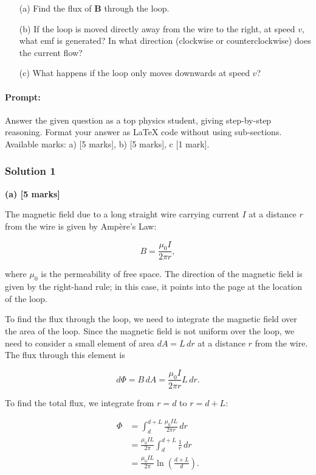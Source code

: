 \documentclass{article}
\begin{document}
\begin{enumerate}
    \item[(a)] Find the flux of $\mathbf{B}$ through the loop.
    \item[(b)] If the loop is moved directly away from the wire to the right, at speed $v$, what emf is generated? In what direction (clockwise or counterclockwise) does the current flow?
    \item[(c)] What happens if the loop only moves downwards at speed $v$?
\end{enumerate}


\paragraph{Prompt: \\} 
Answer the given question as a top physics student, giving step-by-step reasoning. Format your answer as LaTeX code without using sub-sections. Available marks: a) [5 marks], b) [5 marks], c [1 mark].

\subsubsection{Solution 1}
\textbf{(a) [5 marks]}

The magnetic field due to a long straight wire carrying current $I$ at a distance $r$ from the wire is given by Ampère's Law:

\begin{equation*}
B = \frac{\mu_0 I}{2 \pi r},
\end{equation*}

where $\mu_0$ is the permeability of free space. The direction of the magnetic field is given by the right-hand rule; in this case, it points into the page at the location of the loop.

To find the flux through the loop, we need to integrate the magnetic field over the area of the loop. Since the magnetic field is not uniform over the loop, we need to consider a small element of area $dA = L \, dr$ at a distance $r$ from the wire. The flux through this element is

\begin{equation*}
d\Phi = B \, dA = \frac{\mu_0 I}{2 \pi r} L \, dr.
\end{equation*}

To find the total flux, we integrate from $r = d$ to $r = d + L$:

\begin{align*}
\Phi &= \int_{d}^{d+L} \frac{\mu_0 I L}{2 \pi r} \, dr \\
&= \frac{\mu_0 I L}{2 \pi} \int_{d}^{d+L} \frac{1}{r} \, dr \\
&= \frac{\mu_0 I L}{2 \pi} \ln \left( \frac{d+L}{d} \right).
\end{align*}
\end{document}

